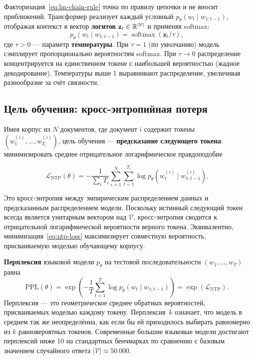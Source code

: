 Факторизация~\eqref{eq:lm-chain-rule} точна по правилу цепочки и не вносит приближений. Трансформер реализует каждый условный $p_\theta(w_t \mid w_{1:t-1})$, отображая контекст в вектор \textbf{логитов} $\mathbf{z}_t \in \mathbb{R}^{|\mathcal{V}|}$ и применяя softmax:
\begin{equation}
\label{eq:lm-softmax}
p_\theta(w_t \mid w_{1:t-1}) = \operatorname{softmax}\!\left(\mathbf{z}_t / \tau\right),
\end{equation}
где $\tau > 0$ --- параметр \textbf{температуры}. При $\tau = 1$ (по умолчанию) модель сэмплирует пропорционально вероятностям softmax. При $\tau \to 0$ распределение концентрируется на единственном токене с наибольшей вероятностью (жадное декодирование). Температуры выше 1 выравнивают распределение, увеличивая разнообразие за счёт связности.

\subsection{Цель обучения: кросс-энтропийная потеря}

Имея корпус из $N$ документов, где документ $i$ содержит токены $(w_1^{(i)}, \ldots, w_{T_i}^{(i)})$, цель обучения --- \textbf{предсказание следующего токена}: минимизировать среднее отрицательное логарифмическое правдоподобие

\begin{equation}
\label{eq:ntp-loss}
\mathcal{L}_{\mathrm{NTP}}(\theta) = -\frac{1}{\sum_i T_i}\sum_{i=1}^{N}\sum_{t=1}^{T_i} \log p_\theta\!\left(w_t^{(i)} \mid w_{1:t-1}^{(i)}\right).
\end{equation}

Это кросс-энтропия между эмпирическим распределением данных и предсказанным распределением модели. Поскольку истинный следующий токен всегда является унитарным вектором над $\mathcal{V}$, кросс-энтропия сводится к отрицательной логарифмической вероятности верного токена. Эквивалентно, минимизация~\eqref{eq:ntp-loss} максимизирует совместную вероятность, присваиваемую моделью обучающему корпусу.

\begin{definition}[Перплексия]
\label{def:perplexity}
\textbf{Перплексия} языковой модели $p_\theta$ на тестовой последовательности $(w_1, \ldots, w_T)$ равна
\begin{equation}
\label{eq:perplexity}
\mathrm{PPL}(\theta) = \exp\!\left(-\frac{1}{T}\sum_{t=1}^{T}\log p_\theta(w_t \mid w_{1:t-1})\right) = \exp(\mathcal{L}_{\mathrm{NTP}}).
\end{equation}
Перплексия --- это геометрическое среднее обратных вероятностей, присваиваемых моделью каждому токену. Перплексия~$k$ означает, что модель в среднем так же неопределённа, как если бы ей приходилось выбирать равномерно из $k$ равновероятных токенов. Современные большие языковые модели достигают перплексий ниже 10 на стандартных бенчмарках по сравнению с базовым значением случайного ответа $|\mathcal{V}| \approx 50~000$.
\end{definition}


